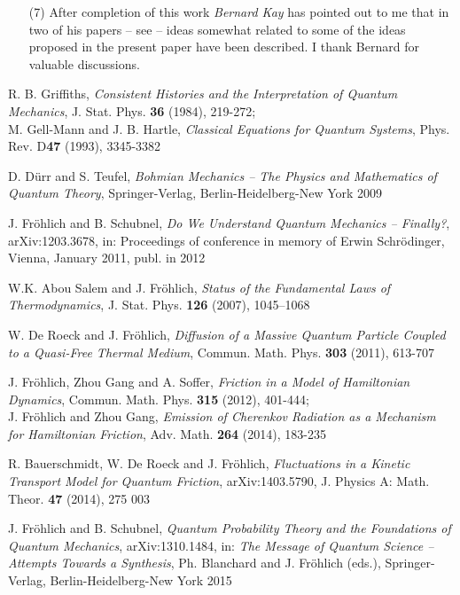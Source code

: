 \documentclass[12pt]{article}
\begin{document}
\begin{enumerate}
\item[(7)]{After completion of this work \textit{Bernard Kay} has pointed out to me that in two of his papers -- see \cite{Kay} -- ideas somewhat related to some of the ideas proposed in the present paper have been described. I thank Bernard for valuable discussions.}

\end{enumerate}


\begin{thebibliography}{References}

R. B. Griffiths, \textit{Consistent Histories and the Interpretation of Quantum Mechanics}, J. Stat. Phys. {\bf{36}} (1984), 219-272;\\
M. Gell-Mann and J. B. Hartle, \textit{Classical Equations for Quantum Systems}, Phys. Rev. D{\bf{47}} (1993), 3345-3382 

 D. D\"{u}rr and S. Teufel, \textit{Bohmian Mechanics -- The Physics and Mathematics of Quantum Theory}, Springer-Verlag, Berlin-Heidelberg-New York 2009

J. Fr\"{o}hlich and B. Schubnel, \textit{Do We Understand Quantum Mechanics -- Finally?}, arXiv:1203.3678, in: Proceedings of conference in memory of Erwin Schr\"{o}dinger, Vienna, January 2011, publ. in 2012

 W.K. Abou Salem and J. Fr\"{o}hlich, \textit{Status of the Fundamental Laws of Thermodynamics}, J. Stat. Phys. {\bf{126}} (2007), 1045–1068

 W. De Roeck and J. Fr\"{o}hlich, \textit{Diffusion of a Massive Quantum Particle Coupled to a Quasi-Free Thermal Medium}, Commun. Math. Phys. {\bf{303}} (2011), 613-707

 J. Fr\"{o}hlich, Zhou Gang and A. Soffer, \textit{Friction in a Model of Hamiltonian Dynamics}, Commun. Math. Phys. {\bf{315}} (2012), 401-444;\\
J. Fr\"{o}hlich and Zhou Gang, \textit{Emission of Cherenkov Radiation as a Mechanism for Hamiltonian Friction}, Adv. Math. {\bf{264}} (2014), 183-235

 R. Bauerschmidt, W. De Roeck and J. Fr\"{o}hlich, \textit{Fluctuations in a Kinetic Transport Model for Quantum Friction}, arXiv:1403.5790, J. Physics A: Math. Theor. {\bf{47}} (2014), 275 003

 J. Fr\"{o}hlich and B. Schubnel, \textit{Quantum Probability Theory and the Foundations of Quantum Mechanics}, arXiv:1310.1484, in: \textit{The Message of Quantum Science -- Attempts Towards a Synthesis}, Ph. Blanchard and J. Fr\"{o}hlich (eds.), Springer-Verlag, Berlin-Heidelberg-New York 2015


\end{thebibliography}
\end{document}
